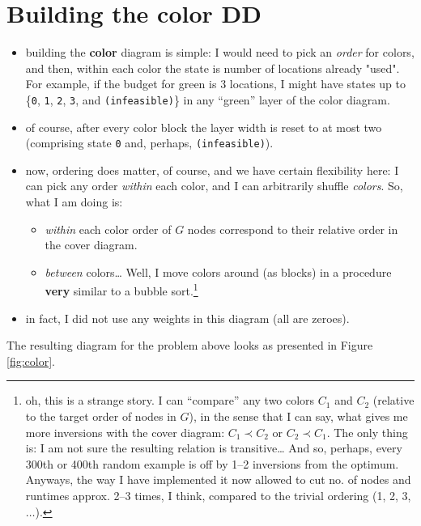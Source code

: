 \documentclass[11pt]{article}
\begin{document}
\section{Building the color DD}
\label{sec:orged16bd0}
\begin{itemize}
\item building the \textbf{color} diagram is simple: I would need to pick an \emph{order} for
colors, and then, within each color the state is number of locations already
"used". For example, if the budget for green is 3 locations, I might have
states up to \{\texttt{0}, \texttt{1}, \texttt{2}, \texttt{3}, and \texttt{(infeasible)}\} in any ``green'' layer
of the color diagram.
\item of course, after every color block the layer width is reset to at most two
(comprising state \texttt{0} and, perhaps, \texttt{(infeasible)}).
\item now, ordering does matter, of course, and we have certain flexibility here: I
can pick any order \emph{within} each color, and I can arbitrarily shuffle
\emph{colors}. So, what I am doing is:
\begin{itemize}
\item \emph{within} each color order of \(G\) nodes correspond to their relative order in the cover diagram.
\item \emph{between} colors\ldots{} Well, I move colors around (as blocks) in a procedure
\textbf{very} similar to a bubble sort.\footnote{oh, this is a strange story. I can ``compare'' any two colors \(C_1\)
and \(C_2\) (relative to the target order of nodes in \(G\)), in the sense that I
can say, what gives me more inversions with the cover diagram: \(C_1 \prec C_2\)
or \(C_2 \prec C_1\). The only thing is: I am not sure the resulting relation is
transitive\ldots{} And so, perhaps, every 300th or 400th random example is off by
1--2 inversions from the optimum. Anyways, the way I have implemented it now
allowed to cut no. of nodes and runtimes approx. 2--3 times, I think, compared
to the trivial ordering (1, 2, 3, \(\ldots\)).}
\end{itemize}
\item in fact, I did not use any weights in this diagram (all are zeroes).
\end{itemize}

The resulting diagram for the problem above looks as presented in Figure \ref{fig:color}.
\end{document}
